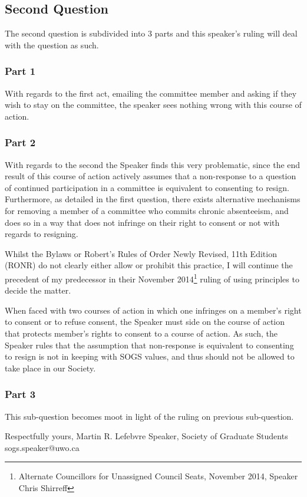 \subsection*{Second Question}

The second question is subdivided into 3 parts and this speaker's ruling will deal with the question as such. 
\subsubsection*{Part 1}
With regards to the first act, emailing the committee member and asking if they wish to stay on the committee, the speaker sees nothing wrong with this course of action. 

\subsubsection*{Part 2}
With regards to the second the Speaker finds this very problematic, since the end result of this course of action actively assumes that a non-response to a question of continued participation in a committee is equivalent to consenting to resign. Furthermore, as detailed in the first question, there exists alternative mechanisms for removing a member of a committee who commits chronic absenteeism, and does so in a way that does not infringe on their right to consent or not with regards to resigning.    

Whilst the Bylaws or Robert's Rules of Order Newly Revised, 11th Edition (RONR) do not clearly either allow or prohibit this practice, I will continue the precedent of my predecessor in their November 2014\footnote{Alternate Councillors for Unassigned Council Seats, November 2014, Speaker Chris Shirreff} ruling of using principles to decide the matter.  

When faced with two courses of action in which one infringes on a member's right to consent or to refuse consent, the Speaker must side on the course of action that protects member's rights to consent to a course of action.  As such, the Speaker rules that the assumption that non-response is equivalent to consenting to resign is not in keeping with SOGS values, and thus should not be allowed to take place in our Society.  
	
\subsubsection*{Part 3}
This sub-question becomes moot in light of the ruling on previous sub-question. 

\vskip 3cm


\noindent
Respectfully yours, \newline
\noindent
Martin R. Lefebvre \newline
\indent
Speaker, \newline 
\indent
Society of Graduate Students \newline
\indent
sogs.speaker@uwo.ca \newline
